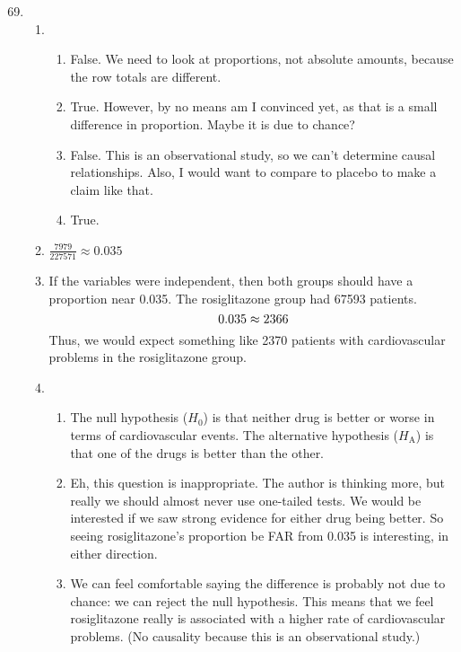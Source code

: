 \documentclass[12pt,letterpaper]{article}
\begin{document}
\begin{enumerate}
\setcounter{enumi}{68}

\item
\begin{enumerate}
\item
    \begin{enumerate}
    \item False. We need to look at proportions, not absolute amounts, because the row totals are different.
    \item True. However, by no means am I convinced yet, as that is a small difference in proportion. Maybe it is due to chance?
    \item False. This is an observational study, so we can't determine causal relationships. Also, I would want to compare to placebo to make a claim like that.
    \item True. 
    \end{enumerate}
\item $\frac{7979}{227571} \approx 0.035$
\item If the variables were independent, then both groups should have a proportion near 0.035. The rosiglitazone group had 67593 patients. 
$$0.035 \time 67593 \approx 2366 $$
Thus, we would expect something like 2370 patients with cardiovascular problems in the rosiglitazone group.
\item 
\begin{enumerate}
    \item The null hypothesis ($H_0$) is that neither drug is better or worse in terms of cardiovascular events. The alternative hypothesis ($H_{\mathrm{A}}$) is that one of the drugs is better than the other.
   \item Eh, this question is inappropriate. The author is thinking more, but really we should almost never use one-tailed tests. We would be interested if we saw strong evidence for either drug being better. So seeing rosiglitazone's proportion be FAR from 0.035 is interesting, in either direction.
   \item We can feel comfortable saying the difference is probably not due to chance: we can reject the null hypothesis. This means that we feel rosiglitazone really is associated with a higher rate of cardiovascular problems. (No causality because this is an observational study.)
\end{enumerate}
\end{enumerate}



\end{enumerate}
\end{document}
